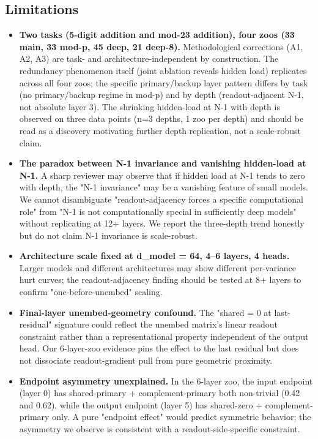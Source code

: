 \subsection{Limitations}

\begin{itemize}
  \item \textbf{Two tasks (5-digit addition and mod-23 addition), four zoos (33 main, 33 mod-p, 45 deep, 21 deep-8).} Methodological corrections (A1, A2, A3) are task- and architecture-independent by construction. The redundancy phenomenon itself (joint ablation reveals hidden load) replicates across all four zoos; the specific primary/backup layer pattern differs by task (no primary/backup regime in mod-p) and by depth (readout-adjacent N-1, not absolute layer 3). The shrinking hidden-load at N-1 with depth is observed on three data points (n=3 depths, 1 zoo per depth) and should be read as a discovery motivating further depth replication, not a scale-robust claim.
  \item \textbf{The paradox between N-1 invariance and vanishing hidden-load at N-1.} A sharp reviewer may observe that if hidden load at N-1 tends to zero with depth, the "N-1 invariance" may be a vanishing feature of small models. We cannot disambiguate "readout-adjacency forces a specific computational role" from "N-1 is not computationally special in sufficiently deep models" without replicating at 12+ layers. We report the three-depth trend honestly but do not claim N-1 invariance is scale-robust.
  \item \textbf{Architecture scale fixed at d\_model = 64, 4--6 layers, 4 heads.} Larger models and different architectures may show different per-variance hurt curves; the readout-adjacency finding should be tested at 8+ layers to confirm "one-before-unembed" scaling.
  \item \textbf{Final-layer unembed-geometry confound.} The "shared = 0 at last-residual" signature could reflect the unembed matrix's linear readout constraint rather than a representational property independent of the output head. Our 6-layer-zoo evidence pins the effect to the last residual but does not dissociate readout-gradient pull from pure geometric proximity.
  \item \textbf{Endpoint asymmetry unexplained.} In the 6-layer zoo, the input endpoint (layer 0) has shared-primary + complement-primary both non-trivial (0.42 and 0.62), while the output endpoint (layer 5) has shared-zero + complement-primary only. A pure "endpoint effect" would predict symmetric behavior; the asymmetry we observe is consistent with a readout-side-specific constraint.

\end{itemize}
